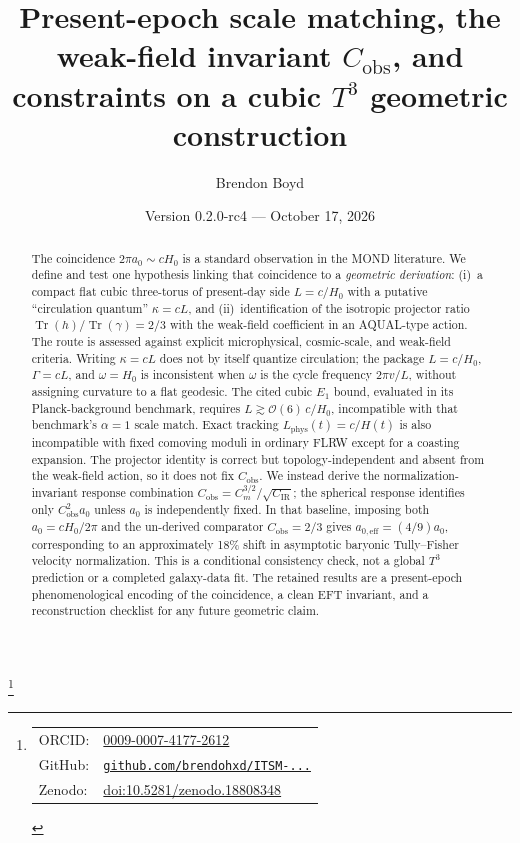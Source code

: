 \documentclass[aps,prd,reprint,superscriptaddress,nofootinbib,floatfix,showkeys]{revtex4-2}
\newcommand{\Tthree}{T^{3}}
\newcommand{\Cobs}{C_{\mathrm{obs}}}
\newcommand{\Cm}{C_{m}}
\newcommand{\CIR}{C_{\mathrm{IR}}}
\newcommand{\azero}{a_{0}}
\newcommand{\Hzero}{H_{0}}
\begin{document}
\title{Present-epoch scale matching, the weak-field invariant
\texorpdfstring{\(\Cobs\)}{C\_obs}, and constraints on a cubic
\texorpdfstring{\(\Tthree\)}{T3} geometric construction}

\author{Brendon Boyd}
\thanks{%
\begin{tabular}{@{}l@{\ }l@{}}
ORCID: & \href{https://orcid.org/0009-0007-4177-2612}{0009-0007-4177-2612} \\
GitHub: & \href{https://github.com/brendohxd/ITSM-Integrated-Toroidal-Syntropic-Model}{\texttt{github.com/brendohxd/ITSM-...}} \\
Zenodo: & \href{https://doi.org/10.5281/zenodo.18808348}{doi:10.5281/zenodo.18808348} \\
\end{tabular}%
}

\date{Version 0.2.0-rc4 --- October 17, 2026}

\begin{abstract}
The coincidence \(2\pi\azero\sim c\Hzero\) is a standard observation in the
MOND literature.  We define and test one hypothesis linking that coincidence to a
\emph{geometric derivation}: (i)~a compact flat cubic three-torus of present-day
side \(L=c/\Hzero\) with a putative ``circulation quantum'' \(\kappa=cL\), and
(ii)~identification of the isotropic projector ratio
\(\operatorname{Tr}(h)/\operatorname{Tr}(\gamma)=2/3\) with the weak-field
coefficient in an AQUAL-type action.  The route is assessed against explicit
microphysical, cosmic-scale, and weak-field criteria.  Writing \(\kappa=cL\)
does not by itself quantize circulation; the package \(L=c/\Hzero\),
\(\Gamma=cL\), and \(\omega=\Hzero\) is inconsistent when \(\omega\) is the
cycle frequency \(2\pi v/L\), without assigning curvature to a flat geodesic.
The cited cubic \(E_1\) bound, evaluated in its Planck-background benchmark,
requires \(L\gtrsim\mathcal{O}(6)\,c/\Hzero\), incompatible with that
benchmark's \(\alpha=1\) scale match.  Exact tracking \(L_{\mathrm{phys}}(t)=c/H(t)\) is
also incompatible with fixed comoving moduli in ordinary FLRW except for a
coasting expansion.  The projector identity is correct but
topology-independent and absent from the weak-field action, so it does not fix
\(\Cobs\).  We instead derive the normalization-invariant response combination
\(\Cobs=\Cm^{3/2}/\sqrt{\CIR}\); the spherical response identifies only
\(\Cobs^2\azero\) unless \(\azero\) is independently fixed.  In that baseline, imposing
both \(\azero=c\Hzero/2\pi\) and the un-derived comparator \(\Cobs=2/3\)
gives \(a_{0,\mathrm{eff}}=(4/9)\azero\), corresponding to an approximately
18\% shift in asymptotic baryonic Tully--Fisher velocity normalization.  This
is a conditional consistency check, not a global \(\Tthree\) prediction or a
completed galaxy-data fit.  The retained results are a present-epoch
phenomenological encoding of the coincidence, a clean EFT invariant, and a
reconstruction checklist for any future geometric claim.
\end{abstract}
\end{document}
